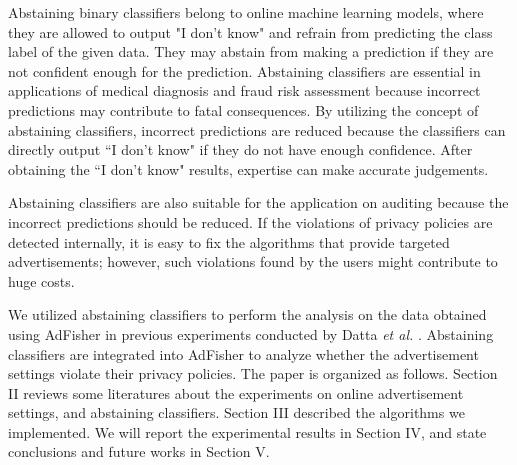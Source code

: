 \documentclass[12pt, journal]{IEEEtran}
\begin{document}
Abstaining binary classifiers belong to online machine learning models, where they are allowed to output "I don't know" and refrain from predicting the class label of the given data.
They may abstain from making a prediction if they are not confident enough for the prediction. 
Abstaining classifiers are essential in applications of medical diagnosis and fraud risk assessment because incorrect predictions may contribute to fatal consequences\cite{akshay}.
By utilizing the concept of abstaining classifiers, incorrect predictions are reduced because the classifiers can directly output ``I don't know" if they do not have enough confidence.
After obtaining the ``I don't know" results, expertise can make accurate judgements.

Abstaining classifiers are also suitable for the application on auditing because the incorrect predictions should be reduced.
If the violations of privacy policies are detected internally, it is easy to fix the algorithms that provide targeted advertisements; however, such violations found by the users might contribute to huge costs.

We utilized abstaining classifiers to perform the analysis on the data obtained using AdFisher in previous experiments conducted by Datta \textit{et al.} \cite{datta}.
Abstaining classifiers are integrated into AdFisher to analyze whether the advertisement settings violate their privacy policies.
The paper is organized as follows. Section II reviews some literatures about the experiments on online advertisement settings, and abstaining classifiers. 
Section III described the algorithms we implemented.
We will report the experimental results in Section IV, and state conclusions and future works in Section V.   






\end{document}
